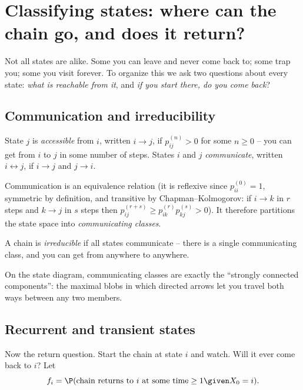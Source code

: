 \section{Classifying states: where can the chain go, and does it return?}
\label{ch23:classification}

Not all states are alike. Some you can leave and never come back to; some trap you; some you
visit forever. To organize this we ask two questions about every state: \emph{what is
reachable from it}, and \emph{if you start there, do you come back}?

\subsection{Communication and irreducibility}

\begin{definition}
\label{ch23:def-communicate}
State $j$ is \emph{accessible} from $i$, written $i \to j$, if $p_{ij}^{(n)} > 0$ for some
$n \ge 0$ -- you can get from $i$ to $j$ in some number of steps. States $i$ and $j$
\emph{communicate}, written $i \leftrightarrow j$, if $i \to j$ and $j \to i$.
\end{definition}

Communication is an equivalence relation (it is reflexive since $p_{ii}^{(0)}=1$, symmetric by
definition, and transitive by Chapman--Kolmogorov: if $i \to k$ in $r$ steps and $k \to j$ in
$s$ steps then $p_{ij}^{(r+s)} \ge p_{ik}^{(r)}p_{kj}^{(s)} > 0$). It therefore partitions the
state space into \emph{communicating classes}.

\begin{definition}[Irreducible]
\label{ch23:def-irreducible}
A chain is \emph{irreducible} if all states communicate -- there is a single communicating
class, and you can get from anywhere to anywhere.
\end{definition}

On the state diagram, communicating classes are exactly the ``strongly connected components'':
the maximal blobs in which directed arrows let you travel both ways between any two members.

\subsection{Recurrent and transient states}

Now the return question. Start the chain at state $i$ and watch. Will it ever come back to
$i$? Let
\[
  f_i = \P(\text{chain returns to } i \text{ at some time} \ge 1 \given X_0 = i).
\]

